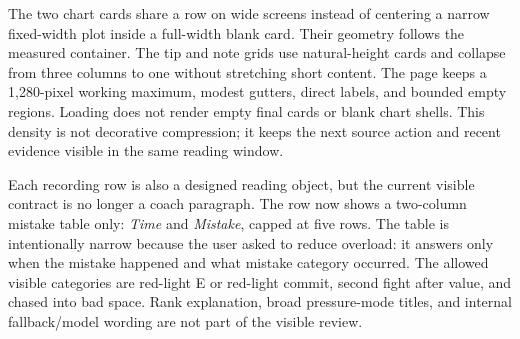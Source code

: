 \documentclass[12pt,letterpaper]{article}
\begin{document}
The two chart cards share a row on wide screens instead of centering a narrow fixed-width plot inside a full-width blank card. Their geometry follows the measured container. The tip and note grids use natural-height cards and collapse from three columns to one without stretching short content. The page keeps a 1,280-pixel working maximum, modest gutters, direct labels, and bounded empty regions. Loading does not render empty final cards or blank chart shells. This density is not decorative compression; it keeps the next source action and recent evidence visible in the same reading window.

Each recording row is also a designed reading object, but the current visible contract is no longer a coach paragraph. The row now shows a two-column mistake table only: \emph{Time} and \emph{Mistake}, capped at five rows. The table is intentionally narrow because the user asked to reduce overload: it answers only when the mistake happened and what mistake category occurred. The allowed visible categories are red-light E or red-light commit, second fight after value, and chased into bad space. Rank explanation, broad pressure-mode titles, and internal fallback/model wording are not part of the visible review.
\end{document}
